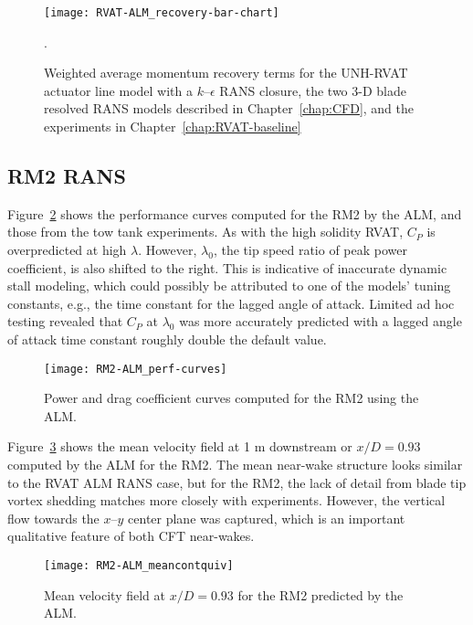 \begin{figure}
    \centering

    \texttt{[image: RVAT-ALM\_recovery-bar-chart]}

    \caption{Weighted average momentum recovery terms for the UNH-RVAT actuator
        line model with a $k$--$\epsilon$ RANS closure, the two 3-D blade resolved
        RANS models described in Chapter~\ref{chap:CFD}, and the experiments in
        Chapter~\ref{chap:RVAT-baseline}}.

    \label{fig:RVAT-ALM-recovery}
\end{figure}


\subsection{RM2 RANS}

Figure~\ref{fig:RM2-ALM-perf-curves} shows the performance curves computed for
the RM2 by the ALM, and those from the tow tank experiments. As with the high
solidity RVAT, $C_P$ is overpredicted at high $\lambda$. However, $\lambda_0$,
the tip speed ratio of peak power coefficient, is also shifted to the right.
This is indicative of inaccurate dynamic stall modeling, which could possibly be
attributed to one of the models' tuning constants, e.g., the time constant for
the lagged angle of attack. Limited ad hoc testing revealed that $C_P$ at
$\lambda_0$ was more accurately predicted with a lagged angle of attack time
constant roughly double the default value.

\begin{figure}
    \centering

    \texttt{[image: RM2-ALM\_perf-curves]}

    \caption{Power and drag coefficient curves computed for the RM2 using the
        ALM.}

    \label{fig:RM2-ALM-perf-curves}
\end{figure}

Figure~\ref{fig:RM2-ALM-meancontquiv} shows the mean velocity field at 1 m
downstream or $x/D=0.93$ computed by the ALM for the RM2. The mean near-wake
structure looks similar to the RVAT ALM RANS case, but for the RM2, the lack of
detail from blade tip vortex shedding matches more closely with experiments.
However, the vertical flow towards the $x$--$y$ center plane was captured, which
is an important qualitative feature of both CFT near-wakes.

\begin{figure}
    \centering

    \texttt{[image: RM2-ALM\_meancontquiv]}

    \caption{Mean velocity field at $x/D=0.93$ for the RM2 predicted by the
        ALM.}

    \label{fig:RM2-ALM-meancontquiv}
\end{figure}

